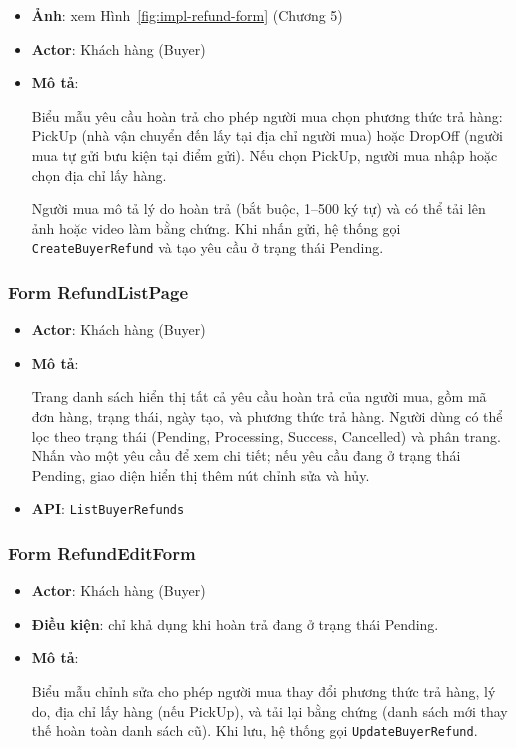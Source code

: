 \begin{itemize}[leftmargin=*]
  \item \textbf{Ảnh}: xem Hình~\ref{fig:impl-refund-form} (Chương 5)
  \item \textbf{Actor}: Khách hàng (Buyer)
  \item \textbf{Mô tả}:

Biểu mẫu yêu cầu hoàn trả cho phép người mua chọn phương thức trả hàng: PickUp (nhà vận chuyển đến lấy tại địa chỉ người mua) hoặc DropOff (người mua tự gửi bưu kiện tại điểm gửi). Nếu chọn PickUp, người mua nhập hoặc chọn địa chỉ lấy hàng.

Người mua mô tả lý do hoàn trả (bắt buộc, 1--500 ký tự) và có thể tải lên ảnh hoặc video làm bằng chứng. Khi nhấn gửi, hệ thống gọi \texttt{CreateBuyerRefund} và tạo yêu cầu ở trạng thái Pending.
\end{itemize}

\subsubsection{Form RefundListPage}
\label{subsubsec:form-refund-list}

\begin{itemize}[leftmargin=*]
  \item \textbf{Actor}: Khách hàng (Buyer)
  \item \textbf{Mô tả}:

Trang danh sách hiển thị tất cả yêu cầu hoàn trả của người mua, gồm mã đơn hàng, trạng thái, ngày tạo, và phương thức trả hàng. Người dùng có thể lọc theo trạng thái (Pending, Processing, Success, Cancelled) và phân trang. Nhấn vào một yêu cầu để xem chi tiết; nếu yêu cầu đang ở trạng thái Pending, giao diện hiển thị thêm nút chỉnh sửa và hủy.

  \item \textbf{API}: \texttt{ListBuyerRefunds}
\end{itemize}

\subsubsection{Form RefundEditForm}
\label{subsubsec:form-refund-edit}

\begin{itemize}[leftmargin=*]
  \item \textbf{Actor}: Khách hàng (Buyer)
  \item \textbf{Điều kiện}: chỉ khả dụng khi hoàn trả đang ở trạng thái Pending.
  \item \textbf{Mô tả}:

Biểu mẫu chỉnh sửa cho phép người mua thay đổi phương thức trả hàng, lý do, địa chỉ lấy hàng (nếu PickUp), và tải lại bằng chứng (danh sách mới thay thế hoàn toàn danh sách cũ). Khi lưu, hệ thống gọi \texttt{UpdateBuyerRefund}.
\end{itemize}

